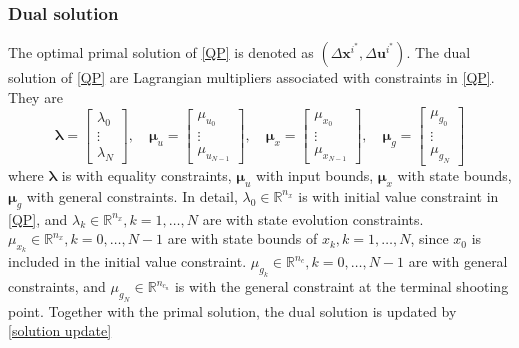 \documentclass{article}
\begin{document}
\subsubsection{Dual solution}
The optimal primal solution of \eqref{QP} is denoted as $(\Delta \mathbf{x}^{i^*}, \Delta \mathbf{u}^{i^*})$. 
The dual solution of \eqref{QP} are Lagrangian multipliers associated with constraints in \eqref{QP}. They are
\begin{equation}
\mathbf{\lambda} = \begin{bmatrix}
\lambda_0\\
\vdots\\
\lambda_N
\end{bmatrix}, \quad \mathbf{\mu}_u = \begin{bmatrix}
\mu_{u_0}\\
\vdots\\
\mu_{u_{N-1}}
\end{bmatrix},\quad \mathbf{\mu}_x = \begin{bmatrix}
\mu_{x_0}\\
\vdots\\
\mu_{x_{N-1}}
\end{bmatrix},\quad \mathbf{\mu}_g = \begin{bmatrix}
\mu_{g_0}\\
\vdots\\
\mu_{g_{N}}
\end{bmatrix}
\end{equation}
where $\mathbf{\lambda}$ is with equality constraints, $\mathbf{\mu}_u$ with input bounds, $\mathbf{\mu}_x$ with state bounds, $\mathbf{\mu}_g$ with general constraints. In detail, $\lambda_0\in\mathbb{R}^{n_x}$ is with initial value constraint in \eqref{QP}, and $\lambda_k\in\mathbb{R}^{n_x},k=1,\ldots,N$ are with state evolution constraints.  $\mu_{x_k}\in\mathbb{R}^{n_x},k=0,\ldots,N-1$ are with state bounds of $x_k, k=1,\ldots,N$, since $x_0$ is included in the initial value constraint. $\mu_{g_k}\in\mathbb{R}^{n_c},k=0,\ldots,N-1$ are with general constraints, and $\mu_{g_N}\in\mathbb{R}^{n_{c_n}}$ is with the general constraint at the terminal shooting point. Together with the primal solution, the dual solution is updated by \eqref{solution update}
\end{document}
